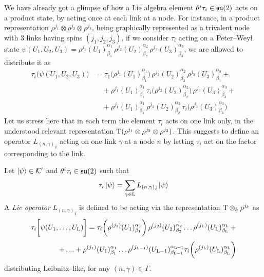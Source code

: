 We have already got a glimpse of how a Lie algebra element $\theta^i\tau_i\in\mathfrak{su}(2)$ acts on a product state, by acting once at each link at a node. For instance, in a product representation $\rho^{j_1}\otimes\rho^{j_2}\otimes\rho^{j_3}$, being graphically represented as a trivalent node with $3$ links having spins $(j_1,j_2,j_3)$, if we consider $\tau_i$ acting on a Peter--Weyl state $\psi(U_1,U_2,U_3)={\rho^{j_1}(U_1)}^{\alpha_1}_{\beta_1}\,{\rho^{j_2}(U_2)}^{\alpha_2}_{\beta_2}\,{\rho^{j_3}(U_3)}^{\alpha_3}_{\beta_3}$, we are allowed to distribute it as
\begin{align*}
    \tau_i\bigg(\psi(U_1,U_2,U_3)\bigg)&=\tau_1\bigg({\rho^{j_1}(U_1)}^{\alpha_1}_{\beta_1}\bigg)\,{\rho^{j_2}(U_2)}^{\alpha_2}_{\beta_2}\,{\rho^{j_3}(U_3)}^{\alpha_3}_{\beta_3}+\\
    &\quad+{\rho^{j_1}(U_1)}^{\alpha_1}_{\beta_1}\,\tau_i\bigg({\rho^{j_2}(U_2)}^{\alpha_2}_{\beta_2}\bigg)\,{\rho^{j_3}(U_3)}^{\alpha_3}_{\beta_3}+\\
    &\quad+{\rho^{j_1}(U_1)}^{\alpha_1}_{\beta_1}\,{\rho^{j_2}(U_2)}^{\alpha_2}_{\beta_2}\,\tau_i\bigg({\rho^{j_3}(U_3)}^{\alpha_3}_{\beta_3}\bigg)
\end{align*}
Let us stress here that in each term the element $\tau_i$ acts on one link only, in the understood relevant representation $\text{\normalfont T}(\rho^{j_1}\otimes\rho^{j_2}\otimes\rho^{j_3})$. This suggests to define an operator ${L_{(n,\gamma)}}_i$ acting on one link $\gamma$ at a node $n$ by letting $\tau_i$ act on the factor corresponding to the link.

\begin{defi}
    Let $\left| \psi \right >\in\mathcal{K}'$ and $\theta^i\tau_i\in\mathfrak{su}(2)$ such that $$\tau_i\left| \psi \right >=\sum_{\gamma\in\text{\normalfont L}}{L_{(n,\gamma)}}_i\left| \psi \right >$$
    A \emph{Lie operator} ${L_{(n,\gamma)}}_i$ is defined to be acting via the representation $\text{\normalfont T}\otimes_k\rho^{j_k}$ as$$\tau_i\bigg[\psi(U_1,\hdots,U_{\text{\normalfont L}})\bigg]=\tau_i\bigg(\rho^{(j_1)}(U_1)^{\alpha_1}_{\beta_1}\bigg)\,\rho^{(j_2)}(U_2)^{\alpha_2}_{\beta_2}\hdots\rho^{(j_{\text{\normalfont L}})}(U_{\text{\normalfont L}})^{\alpha_{\text{\normalfont L}}}_{\beta_{\text{\normalfont L}}}\,+$$
    $$\qquad\qquad+\hdots+\rho^{(j_1)}(U_1)^{\alpha_1}_{\beta_1}\hdots\rho^{(j_{\text{\normalfont L}-1})}(U_{\text{\normalfont L}-1})^{\alpha_{\text{\normalfont L}-1}}_{\beta_{\text{\normalfont L}-1}}\tau_i\bigg(\rho^{(j_{\text{\normalfont L}})}(U_{\text{\normalfont L}})^{\alpha_{\text{\normalfont L}}}_{\beta_{\text{\normalfont L}}}\bigg)$$
    distributing Leibnitz--like, for any $(n,\gamma)\in\Gamma$.
\end{defi}

